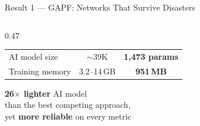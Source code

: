 \documentclass[aspectratio=169,t,10pt]{beamer}
\begin{document}
\begin{frame}[shrink=5]{Result 1 --- GAPF: Networks That Survive Disasters}
\begin{columns}[T]
\begin{column}{0.47\textwidth}
\begin{tabular}{lcc}
    AI model size   & $\sim$39K     & \textbf{1,473 params} \\
    Training memory & 3.2--14\,GB   & \textbf{951\,MB} \\
    \bottomrule
  \end{tabular}
  \vspace{8pt}
  \begin{block}{}
    \centering\small
    \textbf{26$\times$ lighter} AI model\\
    than the best competing approach,\\
    yet \textbf{more reliable} on every metric
  \end{block}
\end{column}
\end{columns}
\end{frame}
\end{document}
